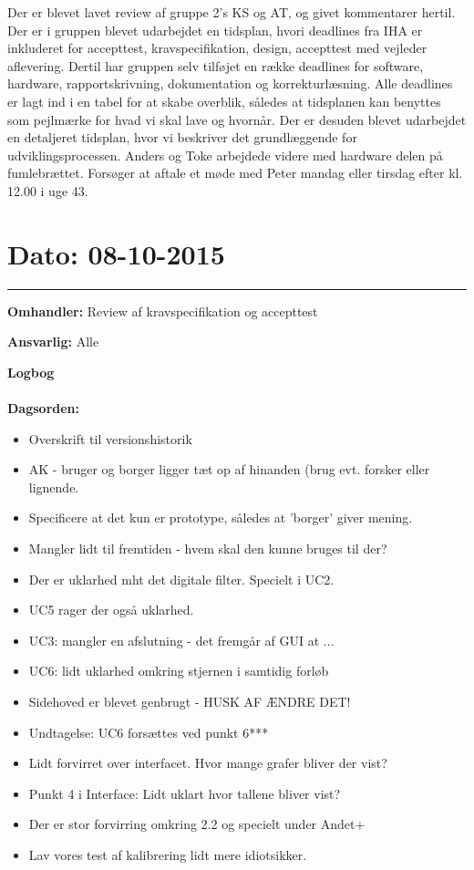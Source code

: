 Der er blevet lavet review af gruppe 2's KS og AT, og givet kommentarer hertil. 
Der er i gruppen blevet udarbejdet en tidsplan, hvori deadlines fra IHA er inkluderet for accepttest, kravspecifikation, design, accepttest med vejleder aflevering. Dertil har gruppen selv tilføjet en række deadlines for software, hardware, rapportskrivning, dokumentation og korrekturlæsning. Alle deadlines er lagt ind i en tabel for at skabe overblik, således at tidsplanen kan benyttes som pejlmærke for hvad vi skal lave og hvornår.
Der er desuden blevet udarbejdet en detaljeret tidsplan, hvor vi beskriver det grundlæggende for udviklingsprocessen.
Anders og Toke arbejdede videre med hardware delen på fumlebrættet.
Forsøger at aftale et møde med Peter mandag eller tirsdag efter kl. 12.00 i uge 43.

	
	

\section{Dato: 08-10-2015 }
\hrule

\textbf{Omhandler:} Review af kravspecifikation og accepttest 

\textbf{Ansvarlig:} Alle

\textbf{Logbog}
\\
\\
\textbf{Dagsorden:}
\begin{itemize}
	\item Overskrift til versionshistorik
	\item AK - bruger og borger ligger tæt op af hinanden (brug evt. forsker eller lignende.
	\item Specificere at det kun er prototype, således at 'borger' giver mening.
	\item Mangler lidt til fremtiden - hvem skal den kunne bruges til der?
	\item Der er uklarhed mht det digitale filter. Specielt i UC2.
	\item UC5 rager der også uklarhed.
	\item UC3: mangler en afslutning - det fremgår af GUI at ...
	\item UC6: lidt uklarhed omkring stjernen i samtidig forløb
	\item Sidehoved er blevet genbrugt - HUSK AF ÆNDRE DET!
	\item Undtagelse: UC6 forsættes ved punkt 6***
	\item Lidt forvirret over interfacet. Hvor mange grafer bliver der vist? 
	\item Punkt 4 i Interface: Lidt uklart hvor tallene bliver vist?
	\item Der er stor forvirring omkring 2.2 og specielt under Andet+
	\item Lav vores test af kalibrering lidt mere idiotsikker. 
\end{itemize}

